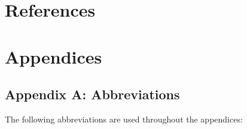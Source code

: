 \documentclass[american,]{article}
\begin{document}
\FloatBarrier

\hypertarget{references}{%
\section*{References}\label{references}}

\hypertarget{refs}{}

\hypertarget{appendices}{%
\section*{Appendices}\label{appendices}}

\hypertarget{AppendixA}{%
\subsection*{Appendix A: Abbreviations}\label{AppendixA}}

The following abbreviations are used throughout the appendices:
\end{document}
